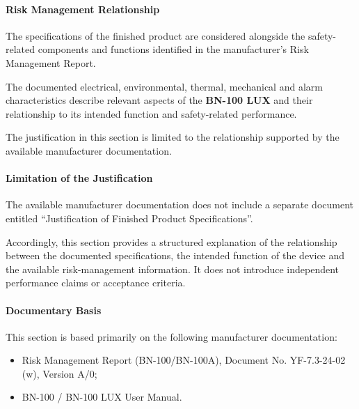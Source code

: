 
\paragraph{Risk Management Relationship}

The specifications of the finished product are considered
alongside the safety-related components and functions identified
in the manufacturer's Risk Management Report.

The documented electrical, environmental, thermal, mechanical and
alarm characteristics describe relevant aspects of the
\textbf{BN-100 LUX} and their relationship to its intended
function and safety-related performance.

The justification in this section is limited to the relationship
supported by the available manufacturer documentation.


\paragraph{Limitation of the Justification}

The available manufacturer documentation does not include a
separate document entitled ``Justification of Finished Product
Specifications''.

Accordingly, this section provides a structured explanation of
the relationship between the documented specifications, the
intended function of the device and the available
risk-management information. It does not introduce independent
performance claims or acceptance criteria.


\paragraph{Documentary Basis}

This section is based primarily on the following manufacturer
documentation:

\begin{itemize}
    \item Risk Management Report (BN-100/BN-100A),
    Document No. YF-7.3-24-02 (w), Version A/0;
    \item BN-100 / BN-100 LUX User Manual.
\end{itemize}

